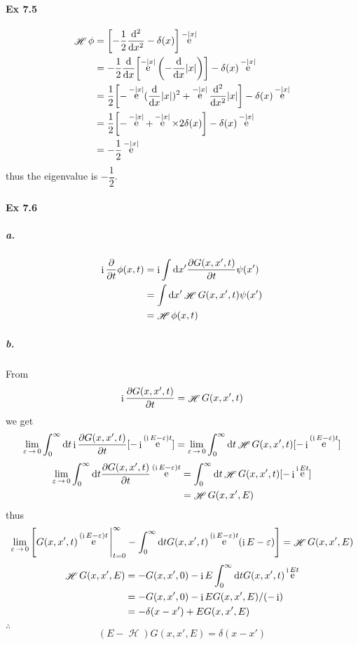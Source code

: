 \documentclass[a4paper]{article}
\DeclareMathOperator{\intinf}{\int_0^\infty}
\DeclareMathOperator{\e}{\mathrm{e}}
\DeclareMathOperator{\I}{\mathrm{i}}
\DeclareMathOperator{\ra}{\rightarrow}
\DeclareMathOperator{\sH}{\mathscr{H}}
\newcommand{\ex}[1]{\paragraph{Ex #1}}
\newcommand{\subex}[1]{\subparagraph{#1}}
\numberwithin{equation}{subsection}
\begin{document}
\ex{7.5}
\begin{align}
\sH \phi &= \qty[-\dfrac{1}{2}\dv[2]{x} - \delta(x)]\e^{-\abs{x}} \notag\\
&= -\dfrac{1}{2}\dv{x}\qty[\e^{-\abs{x}}\qty(-\dv{x}\abs{x})] - \delta(x)\e^{-\abs{x}} \notag\\
&= \dfrac{1}{2}\qty[-\e^{-\abs{x}}(\dv{x}\abs{x})^2 + \e^{-\abs{x}}\dv[2]{x}\abs{x}] - \delta(x)\e^{-\abs{x}} \notag\\
&= \dfrac{1}{2}\qty[-\e^{-\abs{x}} + \e^{-\abs{x}}\times 2\delta(x)] - \delta(x)\e^{-\abs{x}} \notag\\
&= -\dfrac{1}{2}\e^{-\abs{x}} 
\end{align}
thus the eigenvalue is $ -\dfrac{1}{2} $.

\ex{7.6}
\subex{a.}
\begin{align}
\I\pdv{t}\phi(x,t) &= \I\int\dd x' \pdv{G(x,x',t)}{t} \psi(x') \notag\\
&= \int\dd x' \sH G(x,x',t) \psi(x') \notag\\
&= \sH \phi(x,t)
\end{align}
\subex{b.}
From
\begin{equation}\label{key}
\I\pdv{G(x,x',t)}{t} = \sH G(x,x',t)
\end{equation}
we get
\begin{equation}\label{key}
\lim_{\varepsilon\ra 0} 
\intinf\dd t \I\pdv{G(x,x',t)}{t} [-\I\e^{(\I E - \varepsilon)t}] 
= \lim_{\varepsilon\ra 0} 
 \intinf\dd t \sH G(x,x',t)[-\I\e^{(\I E - \varepsilon)t}]
\end{equation}
\begin{align}\label{key}
\lim_{\varepsilon\ra 0}  \intinf\dd t \pdv{G(x,x',t)}{t} \e^{(\I E - \varepsilon)t}
&= \intinf\dd t \sH G(x,x',t) [-\I\e^{\I E t}] \notag\\
&= \sH G(x,x',E)
\end{align}
thus
\begin{align}\label{key}
\lim_{\varepsilon\ra 0} 
\qty[G(x,x',t)\e^{(\I E - \varepsilon)t} \Bigg|_{t=0}^\infty 
- \intinf\dd t G(x,x',t) \e^{(\I E - \varepsilon)t} (\I E - \varepsilon) ] 
= \sH G(x,x',E)
\end{align}
\begin{align}
\sH G(x,x',E) &= -G(x,x',0) 
- \I E \intinf\dd t G(x,x',t) \e^{\I E t}   \notag\\
&= -G(x,x',0) - \I E G(x,x',E) / (-\I)  \notag\\
&= -\delta(x-x') + E G(x,x',E) 
\end{align}
$ \therefore $
\begin{equation}\label{key}
(E - \sH)G(x,x',E) = \delta(x-x')
\end{equation}
\end{document}

